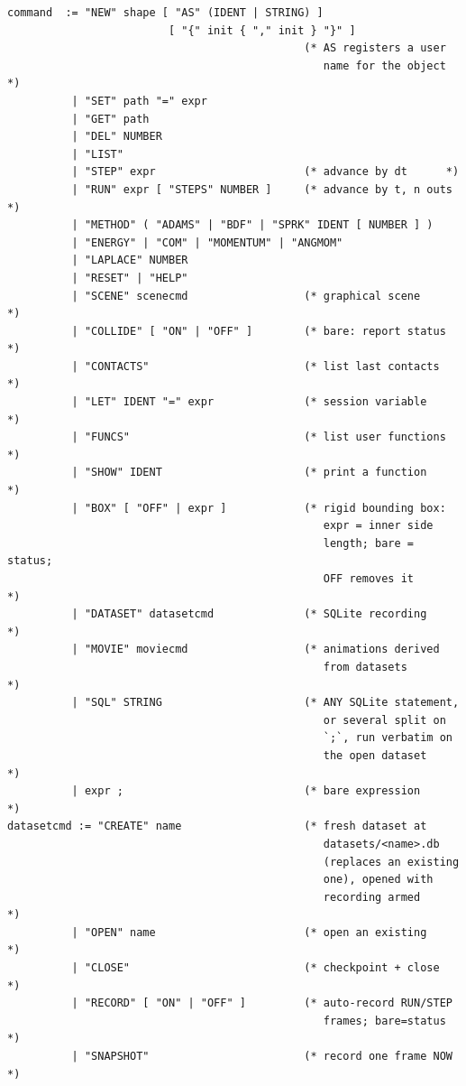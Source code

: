 \documentclass[11pt]{article}
\begin{document}
\begin{lstlisting}
command  := "NEW" shape [ "AS" (IDENT | STRING) ]
                         [ "{" init { "," init } "}" ]
                                              (* AS registers a user
                                                 name for the object *)
          | "SET" path "=" expr
          | "GET" path
          | "DEL" NUMBER
          | "LIST"
          | "STEP" expr                       (* advance by dt      *)
          | "RUN" expr [ "STEPS" NUMBER ]     (* advance by t, n outs *)
          | "METHOD" ( "ADAMS" | "BDF" | "SPRK" IDENT [ NUMBER ] )
          | "ENERGY" | "COM" | "MOMENTUM" | "ANGMOM"
          | "LAPLACE" NUMBER
          | "RESET" | "HELP"
          | "SCENE" scenecmd                  (* graphical scene     *)
          | "COLLIDE" [ "ON" | "OFF" ]        (* bare: report status *)
          | "CONTACTS"                        (* list last contacts  *)
          | "LET" IDENT "=" expr              (* session variable    *)
          | "FUNCS"                           (* list user functions *)
          | "SHOW" IDENT                      (* print a function    *)
          | "BOX" [ "OFF" | expr ]            (* rigid bounding box:
                                                 expr = inner side
                                                 length; bare = status;
                                                 OFF removes it      *)
          | "DATASET" datasetcmd              (* SQLite recording    *)
          | "MOVIE" moviecmd                  (* animations derived
                                                 from datasets       *)
          | "SQL" STRING                      (* ANY SQLite statement,
                                                 or several split on
                                                 `;`, run verbatim on
                                                 the open dataset    *)
          | expr ;                            (* bare expression     *)
datasetcmd := "CREATE" name                   (* fresh dataset at
                                                 datasets/<name>.db
                                                 (replaces an existing
                                                 one), opened with
                                                 recording armed     *)
          | "OPEN" name                       (* open an existing    *)
          | "CLOSE"                           (* checkpoint + close  *)
          | "RECORD" [ "ON" | "OFF" ]         (* auto-record RUN/STEP
                                                 frames; bare=status *)
          | "SNAPSHOT"                        (* record one frame NOW *)

\end{lstlisting}
\end{document}
